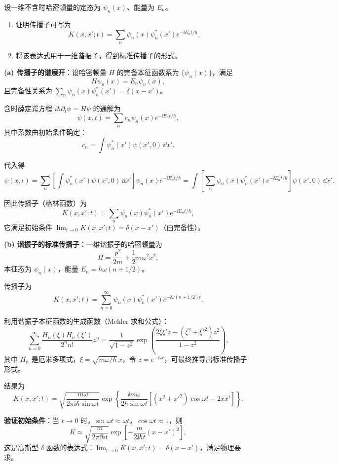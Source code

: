 \begin{question}
设一维不含时哈密顿量的定态为 $\psi_n(x)$、能量为 $E_n$。
\begin{enumerate}
\item 证明传播子可写为
\[
K(x,x';t)=\sum_n\psi_n(x)\psi_n^*(x')e^{-\ii E_nt/\hbar}.
\]
\item 将该表达式用于一维谐振子，得到标准传播子的形式。
\end{enumerate}
\end{question}
\begin{solution}
	\textbf{(a) 传播子的谱展开}：设哈密顿量 $H$ 的完备本征函数系为 $\{\psi_n(x)\}$，满足
	\[
	H\psi_n(x) = E_n\psi_n(x),
	\]
	且完备性关系为 $\sum_n \psi_n(x)\psi_n^*(x') = \delta(x-x')$。

	含时薛定谔方程 $i\hbar\partial_t\psi=H\psi$ 的通解为
	\[
	\psi(x,t) = \sum_n c_n\psi_n(x)e^{-\ii E_n t/\hbar},
	\]
	其中系数由初始条件确定：
	\[
	c_n = \int \psi_n^*(x')\psi(x',0)\,\dd x'.
	\]

	代入得
	\[
	\psi(x,t) = \sum_n \left[\int \psi_n^*(x')\psi(x',0)\,\dd x'\right]\psi_n(x)e^{-\ii E_n t/\hbar}
	= \int \left[\sum_n \psi_n(x)\psi_n^*(x')e^{-\ii E_n t/\hbar}\right] \psi(x',0)\,\dd x'.
	\]

	因此传播子（格林函数）为
	\[
	K(x,x';t) = \sum_n \psi_n(x)\psi_n^*(x')e^{-\ii E_n t/\hbar},
	\]
	它满足初始条件 $\lim_{t\to0} K(x,x';t)=\delta(x-x')$（由完备性）。

	\textbf{(b) 谐振子的标准传播子}：一维谐振子的哈密顿量为
	\[
	H = \frac{p^2}{2m} + \frac12 m\omega^2 x^2,
	\]
	本征态为 $\psi_n(x)$，能量 $E_n = \hbar\omega(n+1/2)$。

	传播子为
	\[
	K(x,x';t) = \sum_{n=0}^\infty \psi_n(x)\psi_n^*(x') e^{-\ii\omega(n+1/2)t}.
	\]

	利用谐振子本征函数的生成函数（Mehler 求和公式）：
	\[
	\sum_{n=0}^\infty \frac{H_n(\xi)H_n(\xi')}{2^n n!}z^n = \frac{1}{\sqrt{1-z^2}}\exp\!\left(\frac{2\xi\xi'z-(\xi^2+\xi'^2)z^2}{1-z^2}\right),
	\]
	其中 $H_n$ 是厄米多项式，$\xi = \sqrt{m\omega/\hbar}\,x$，令 $z=e^{-\ii\omega t}$，可最终推导出标准传播子形式。

	结果为
	\[
	\boxed{K(x,x';t) = \sqrt{\frac{m\omega}{2\pi\ii\hbar\sin\omega t}}
	\exp\!\left\{\frac{\ii m\omega}{2\hbar\sin\omega t}
	\left[(x^2+x'^2)\cos\omega t - 2xx'\right]\right\}}.
	\]

	\textbf{验证初始条件}：当 $t\to0$ 时，$\sin\omega t \approx \omega t$，$\cos\omega t \approx 1$，则
	\[
	K \approx \sqrt{\frac{m}{2\pi\ii\hbar t}} \exp\!\left[-\frac{m}{2\ii\hbar t}(x-x')^2\right],
	\]
	这是高斯型 $\delta$ 函数的表达式：$\lim_{t\to0} K(x,x';t) = \delta(x-x')$，满足物理要求。
	\end{solution}


